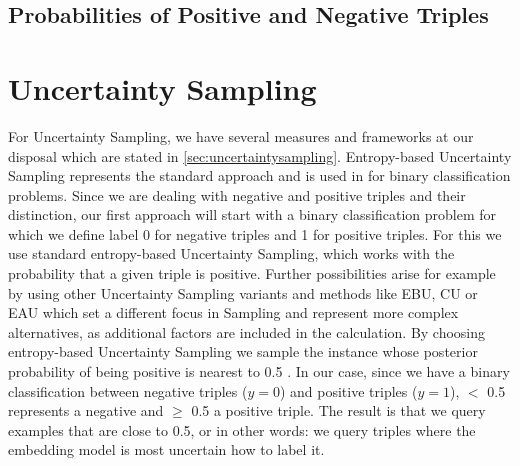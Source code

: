 \subsection{Probabilities of Positive and Negative Triples} \label{sec:probabilities}



\section{Uncertainty Sampling} \label{sec:uncertaintysampling approach}
For Uncertainty Sampling, we have several measures and frameworks at our disposal which are stated in \autoref{sec:uncertaintysampling}.
Entropy-based Uncertainty Sampling represents the standard approach and is used in for binary classification problems.
Since we are dealing with negative and positive triples and their distinction, our first approach will start with a binary classification problem for which we define label 0 for negative triples and 1 for positive triples.
For this we use standard entropy-based Uncertainty Sampling, which works with the probability that a given triple is positive. 
Further possibilities arise for example by using other Uncertainty Sampling variants and methods like \ac{EBU}, \ac{CU} or \ac{EAU} which set a different focus in Sampling and represent more complex alternatives, as additional factors are included in the calculation.
By choosing entropy-based Uncertainty Sampling we sample the instance whose posterior probability of being positive is nearest to 0.5 \cite{Settles2009ActiveLL}.
In our case, since we have a binary classification between negative triples ($y=0$) and positive triples ($y=1$), $<$ 0.5 represents a negative and $\geq$ 0.5 a positive triple.
The result is that we query examples that are close to 0.5, or in other words: 
we query triples where the embedding model is most uncertain how to label it.










